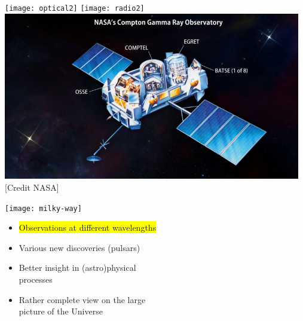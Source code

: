 \begin{center}
\texttt{[image: optical2]}
\texttt{[image: radio2]}\\[5mm]
\includegraphics[keepaspectratio,width=13cm]{cgro2}\\
{\small [Credit NASA]}
\end{center}

\newpage

\begin{center}
\texttt{[image: milky-way]}
\end{center}
%
\begin{itemize}
\item[] \colorbox{yellow}{Observations at different wavelengths}
\item Various new discoveries (pulsars)
\item Better insight in (astro)physical\\
      processes
\item Rather complete view on the large\\
      picture of the Universe
\end{itemize}


